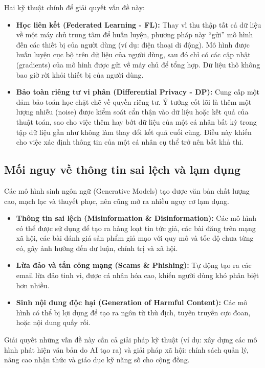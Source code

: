 Hai kỹ thuật chính để giải quyết vấn đề này:
\begin{itemize}
    \item \textbf{Học liên kết (Federated Learning - FL):} Thay vì thu thập tất cả dữ liệu về một máy chủ trung tâm để huấn luyện, phương pháp này “gửi” mô hình đến các thiết bị của người dùng (ví dụ: điện thoại di động). Mô hình được huấn luyện cục bộ trên dữ liệu của người dùng, sau đó chỉ có các cập nhật (gradients) của mô hình được gửi về máy chủ để tổng hợp. Dữ liệu thô không bao giờ rời khỏi thiết bị của người dùng.
    \item \textbf{Bảo toàn riêng tư vi phân (Differential Privacy - DP):} Cung cấp một đảm bảo toán học chặt chẽ về quyền riêng tư. Ý tưởng cốt lõi là thêm một lượng nhiễu (noise) được kiểm soát cẩn thận vào dữ liệu hoặc kết quả của thuật toán, sao cho việc thêm hay bớt dữ liệu của một cá nhân bất kỳ trong tập dữ liệu gần như không làm thay đổi kết quả cuối cùng. Điều này khiến cho việc xác định thông tin của một cá nhân cụ thể trở nên bất khả thi.
\end{itemize}

\subsection{Mối nguy về thông tin sai lệch và lạm dụng}
\label{ssec:thong_tin_sai_lech}

Các mô hình sinh ngôn ngữ (Generative Models) tạo được văn bản chất lượng cao, mạch lạc và thuyết phục, nên cũng mở ra nhiều nguy cơ lạm dụng.
\begin{itemize}
    \item \textbf{Thông tin sai lệch (Misinformation \& Disinformation):} Các mô hình có thể được sử dụng để tạo ra hàng loạt tin tức giả, các bài đăng trên mạng xã hội, các bài đánh giá sản phẩm giả mạo với quy mô và tốc độ chưa từng có, gây ảnh hưởng đến dư luận, chính trị và xã hội.
    \item \textbf{Lừa đảo và tấn công mạng (Scams \& Phishing):} Tự động tạo ra các email lừa đảo tinh vi, được cá nhân hóa cao, khiến người dùng khó phân biệt hơn nhiều.
    \item \textbf{Sinh nội dung độc hại (Generation of Harmful Content):} Các mô hình có thể bị lợi dụng để tạo ra ngôn từ thù địch, tuyên truyền cực đoan, hoặc nội dung quấy rối.
\end{itemize}

Giải quyết những vấn đề này cần cả giải pháp kỹ thuật (ví dụ: xây dựng các mô hình phát hiện văn bản do AI tạo ra) và giải pháp xã hội: chính sách quản lý, nâng cao nhận thức và giáo dục kỹ năng số cho cộng đồng.

